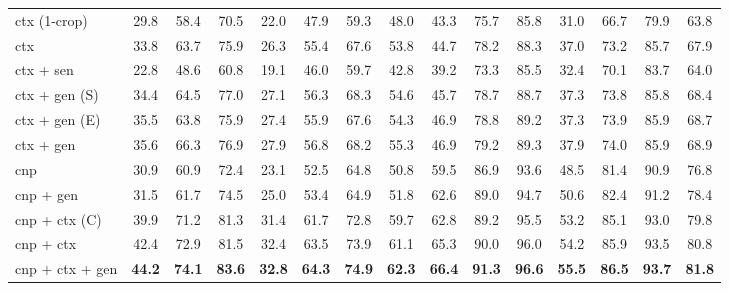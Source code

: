 \documentclass[10pt,twocolumn,letterpaper]{article}
\begin{document}
\begin{table*}[t]
\begin{tabular}{l|ccc|ccc|c|ccc|ccc|c}
\hspace{0mm} ctx (1-crop)             &29.8 &58.4 &70.5 &22.0 &47.9 &59.3 &48.0  &43.3 &75.7 &85.8 &31.0 &66.7 &79.9 &63.8\\
\hspace{0mm} ctx                      &33.8 &63.7 &75.9 &26.3 &55.4 &67.6 &53.8  &44.7 &78.2 &88.3 &37.0 &73.2 &85.7 &67.9\\
\hline
\hspace{0mm} ctx + sen               &22.8 &48.6 &60.8 &19.1 &46.0 &59.7 &42.8  &39.2 &73.3 &85.5 &32.4 &70.1 &83.7 &64.0\\
\hspace{0mm} ctx + gen (S)           &34.4 &64.5 &77.0 &27.1 &56.3 &68.3 &54.6  &45.7 &78.7 &88.7 &37.3 &73.8 &85.8 &68.4\\
\hspace{0mm} ctx + gen (E)           &35.5 &63.8 &75.9 &27.4 &55.9 &67.6 &54.3  &46.9 &78.8 &89.2 &37.3 &73.9 &85.9 &68.7\\
\hspace{0mm} ctx + gen                &35.6 &66.3 &76.9 &27.9 &56.8 &68.2 &55.3  &46.9 &79.2 &89.3 &37.9 &74.0 &85.9 &68.9\\
\hline
\hspace{0mm} cnp                     &30.9 &60.9 &72.4 &23.1 &52.5 &64.8 &50.8  &59.5 &86.9 &93.6 &48.5 &81.4 &90.9 &76.8\\
\hspace{0mm} cnp + gen               &31.5 &61.7 &74.5 &25.0 &53.4 &64.9 &51.8  &62.6 &89.0 &94.7 &50.6 &82.4 &91.2 &78.4\\
\hspace{0mm} cnp + ctx (C)          &39.9 &71.2 &81.3 &31.4 &61.7 &72.8 &59.7  &62.8 &89.2 &95.5 &53.2 &85.1 &93.0 &79.8\\
\hspace{0mm} cnp + ctx              &42.4 &72.9 &81.5 &32.4 &63.5 &73.9 &61.1  &65.3 &90.0 &96.0 &54.2 &85.9 &93.5 &80.8\\
\hline
\hspace{0mm} cnp + ctx + gen          &\bf{44.2} &\bf{74.1} &\bf{83.6} &\bf{32.8} &\bf{64.3} &\bf{74.9} &\bf{62.3}   &\bf{66.4} &\bf{91.3} &\bf{96.6} &\bf{55.5} &\bf{86.5} &\bf{93.7} &\bf{81.8}\\

\hline
\hline
\end{tabular}
\label{table:ablation_result}
\end{table*}
\end{document}
